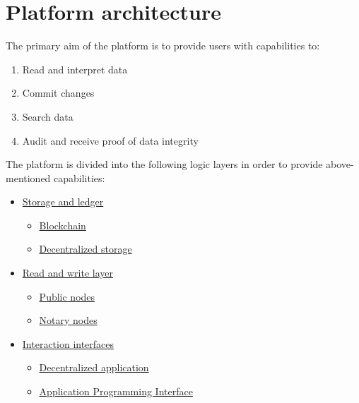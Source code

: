 \documentclass[12pt]{report}
\newcommand{\hlc}[1]{\colorbox{yellow!25}{#1}}
\begin{document}
\section{Platform architecture}
\label{tech-arch}
The primary aim of the platform is to provide users with capabilities to:
\begin{enumerate}
\item Read and interpret data
\item \hlc{Commit} changes
\item Search data
\item Audit and receive proof of data \hlc{integrity}
\end{enumerate}
The platform is divided into the following logic layers in order to provide above-mentioned capabilities:
\begin{itemize}
	\item \hyperref[tech-arch-underlayer]{Storage and \hlc{ledger}}
	\begin{itemize}
		\item \hyperref[tech-blockchain]{Blockchain}
		\item \hyperref[tech-storage]{Decentralized storage}
	\end{itemize}
	\item \hyperref[tech-arch-connect]{Read and write \hlc{layer}}
	\begin{itemize}
		\item \hyperref[tech-arch-connect-nodes]{Public nodes}
		\item \hyperref[tech-arch-connect-validators]{Notary nodes}
	\end{itemize}
	\item \hyperref[tech-arch-interfaces]{Interaction interfaces}
	\begin{itemize}
		\item \hyperref[tech-arch-interfaces-dapp]{Decentralized application}
		\item \hyperref[tech-arch-interfaces-api]{Application Programming Interface}
	\end{itemize}
\end{itemize}

\def\Interface{Interaction Interface}
\def\Connect{Access layer}
\def\Underlayer{Storage and ledger layer}

\def\DApps{Decentralized Applications}
\def\Api{API}
\def\Requests{Direct \hlc{requests}}
\end{document}
